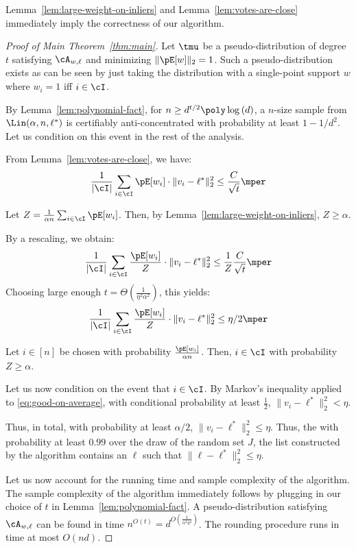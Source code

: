 Lemma~\ref{lem:large-weight-on-inliers} and Lemma~\ref{lem:votes-are-close} immediately imply the correctness of our algorithm. 
\begin{proof}[Proof of Main Theorem~\ref{thm:main}]


Let $\tmu$ be a pseudo-distribution of degree $t$ satisfying $\cA_{w,\ell}$ and minimizing $\|\pE[w]\|_2 = 1$.
 Such a pseudo-distribution exists as can be seen by just taking the distribution with a single-point support $w$ where $w_i = 1$ iff $i \in \cI$. 

By Lemma~\ref{lem:polynomial-fact}, for $n \geq d^{t/2} \poly \log{(d)}$, a $n$-size sample from $\Lin(\alpha,n,\ell^*)$ is certifiably anti-concentrated with probability at least $1-1/d^2$. Let us condition on this event in the rest of the analysis. 


From Lemma~\ref{lem:votes-are-close}, we have: 
\[
\frac{1}{|\cI|} \sum_{i \in \cI} \pE[w_i] \cdot \|v_i -\ell^*\|_2^2 \leq \frac{C}{\sqrt{t}} \mper
\]

Let $Z = \frac{1}{\alpha n} \sum_{i \in \cI} \pE[w_i]$. Then, by Lemma~\ref{lem:large-weight-on-inliers}, $Z \geq \alpha$.

By a rescaling, we obtain:
\begin{equation} 
\frac{1}{|\cI|} \sum_{i \in \cI} \frac{\pE[w_i]}{Z} \cdot \|v_i -\ell^*\|_2^2 \leq \frac{1}{Z} \frac{C}{\sqrt{t}} \mper
\end{equation}
Choosing large enough $t = \Theta(\frac{1}{\eta^2 \alpha^2})$, this yields:  
\begin{equation} 
\label{eq:good-on-average}
\frac{1}{|\cI|} \sum_{i \in \cI} \frac{\pE[w_i]}{Z} \cdot \|v_i -\ell^*\|_2^2 \leq \eta/2 \mper
\end{equation}

Let $i \in [n]$ be chosen with probability $\frac{\pE[w_i]}{\alpha n}$. 
Then, $i \in \cI$ with probability $Z \geq \alpha$. 

Let us now condition on the event that $i \in \cI$. 
By Markov's inequality applied to \eqref{eq:good-on-average}, with conditional probability at least $\frac{1}{2}$, $\|v_i - \ell^*\|_2^2 < \eta$. 

Thus, in total, with probability at least $\alpha/2$, $\|v_i - \ell^*\|_2^2 \leq \eta$.
Thus, the with probability at least $0.99$ over the draw of the random set $J$, the list constructed by the algorithm contains an $\ell$ such that $\|\ell - \ell^*\|_2^2 \leq \eta$.

Let us now account for the running time and sample complexity of the algorithm.
The sample complexity of the algorithm immediately follows by plugging in our choice of $t$ in Lemma~\ref{lem:polynomial-fact}. 
A pseudo-distribution satisfying $\cA_{w,\ell}$ can be found in time $n^{O(t)} = d^{O(\frac{1}{\alpha^4 \eta^4})}$. The rounding procedure runs in time at most $O(nd)$. 




\end{proof}






